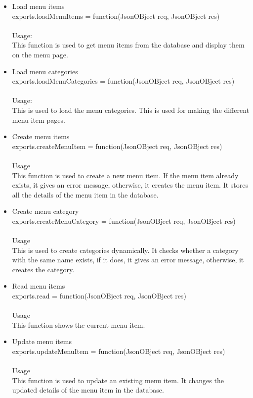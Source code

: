 \documentclass[a4paper,12pt]{report}
\begin{document}
\begin{enumerate}
\begin{itemize}
	\item Load menu items\\ exports.loadMenuItems = function(JsonOBject req, JsonOBject res) \\ \\
	Usage: \\
	This function is used to get menu items from the database and display them on the menu page.
	\item Load menu categories\\ exports.loadMenuCategories = function(JsonOBject req, JsonOBject res)\\  \\
	Usage: \\
	This is used to load the menu categories. This is used for making the different menu item pages. 
	\item Create menu items\\ exports.createMenuItem = function(JsonOBject req, JsonOBject res)\\ \\
 	 Usage\\ 
  	This function is used to create a new menu item. If the menu item already exists, it gives an error message, otherwise, it creates the menu item. It stores all the details of the menu item in the database.
	\item Create menu category\\ exports.createMenuCategory = function(JsonOBject req, JsonOBject res)\\ \\
 	 Usage\\ 
  	This is used to create categories dynamically. It checks whether a category with the same name exists, if it does, it gives an error message, otherwise, it creates the category.
	\item Read menu items\\ exports.read = function(JsonOBject req, JsonOBject res)\\ \\
 	 Usage\\ 
  	This function shows the current menu item.
	\item Update menu items\\ exports.updateMenuItem = function(JsonOBject req, JsonOBject res)\\ \\
 	 Usage\\ 
  	This function is used to update an existing menu item. It changes the updated details of the menu item in the database.

\end{itemize}
\end{enumerate}
\end{document}
